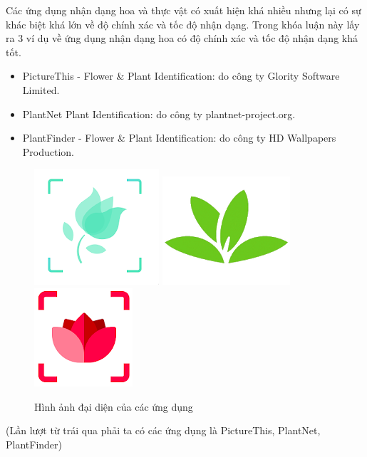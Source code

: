\documentclass[12pt]{report}
\begin{document}
		Các ứng dụng nhận dạng hoa và thực vật có xuất hiện khá nhiều nhưng lại có sự khác biệt khá lớn về độ chính xác và tốc độ nhận dạng. Trong khóa luận này lấy ra 3 ví dụ về ứng dụng nhận dạng hoa có độ chính xác và tốc độ nhận dạng khá tốt.
																				
																						
																				
		\begin{itemize}
			\item PictureThis - Flower \& Plant Identification: do công ty Glority Software Limited.	
			\item PlantNet Plant Identification: do công ty plantnet-project.org.
			\item PlantFinder - Flower \& Plant Identification: do công ty HD Wallpapers Production. 		
		\end{itemize}
																				
		\begin{figure}[h]
			\centering
			\includegraphics[scale=0.7]{picture_this_app}
			\includegraphics[scale=0.7]{plantnet_app}
			\includegraphics[scale=0.7]{plantfinder_app}
			\caption{Hình ảnh đại diện của các ứng dụng}
			\label{fig:app_logo_curent}
		\end{figure}
		(Lần lượt từ trái qua phải ta có các ứng dụng là PictureThis, PlantNet, PlantFinder)
		
\end{document}
